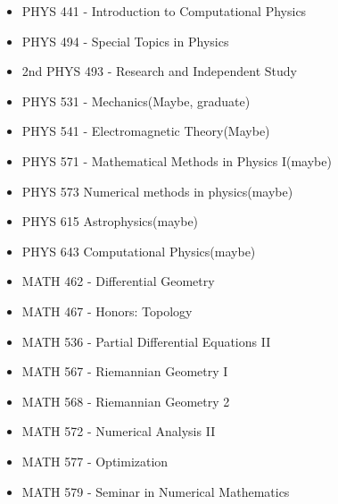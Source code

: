 \begin{itemize}
    \item PHYS 441 - Introduction to Computational Physics
    \item PHYS 494 - Special Topics in Physics 
    \item 2nd PHYS 493 - Research and Independent Study 
    \item PHYS 531 - Mechanics(Maybe, graduate)
    \item PHYS 541 - Electromagnetic Theory(Maybe)
    \item PHYS 571 - Mathematical Methods in Physics I(maybe)
    \item PHYS 573 Numerical methods in physics(maybe)
    \item PHYS 615 Astrophysics(maybe)
    \item PHYS 643 Computational Physics(maybe)
    \item MATH 462 - Differential Geometry
  	\item MATH 467 - Honors: Topology
    \item MATH 536 - Partial Differential Equations II
    \item MATH 567 - Riemannian Geometry I
    \item MATH 568 - Riemannian Geometry 2
    \item MATH 572 - Numerical Analysis II
    \item MATH 577 - Optimization
    \item MATH 579 - Seminar in Numerical Mathematics
\end{itemize}
